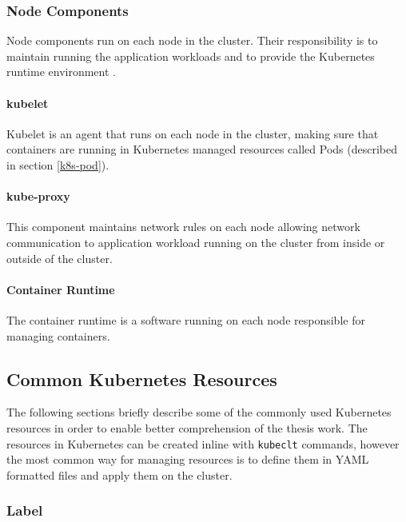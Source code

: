 \subsubsection{Node Components}

Node components run on each node in the cluster. Their responsibility is to maintain running the application workloads and to provide the Kubernetes runtime environment \cite{KubernetesArchitecture}.

\paragraph{kubelet} Kubelet is an agent that runs on each node in the cluster, making sure that containers are running in Kubernetes managed resources called Pods (described in section \ref{k8s-pod}).

\paragraph{kube-proxy} This component maintains network rules on each node allowing network communication to application workload running on the cluster from inside or outside of the cluster.

\paragraph{Container Runtime} The container runtime is a software running on each node responsible for managing containers.

\subsection{Common Kubernetes Resources}

The following sections briefly describe some of the commonly used Kubernetes resources in order to enable better comprehension of the thesis work. The resources in Kubernetes can be created inline with \texttt{kubeclt} commands, however the most common way for managing resources is to define them in YAML formatted files and apply them on the cluster.

\subsubsection{Label}

